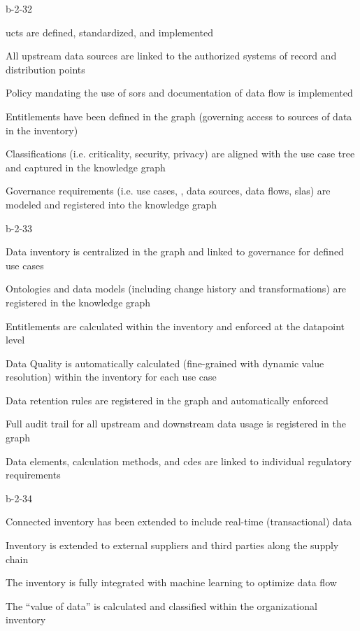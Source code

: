 \begin{level-assessment}{b-2-3}{2}

  \item \glspl{uct} are defined, standardized, and implemented
  \item All upstream data sources are linked to the authorized systems of record and distribution points
  \item Policy mandating the use of \glspl{sor} and documentation of data flow is implemented
  \item Entitlements have been defined in the graph (governing access to sources of data in the inventory)
  \item Classifications (i.e. criticality, security, privacy) are aligned with the use case tree and captured in the
        knowledge graph
  \item Governance requirements (i.e. use cases, , data sources, data flows, \glspl{sla})
        are modeled and registered into the knowledge graph

\end{level-assessment}

\begin{level-assessment}{b-2-3}{3}

  \item Data inventory is centralized in the graph and linked to governance for defined use cases
  \item Ontologies and data models (including change history and transformations) are registered in the knowledge graph
  \item Entitlements are calculated within the inventory and enforced at the datapoint level
  \item Data Quality is automatically calculated (fine-grained with dynamic value resolution) within
        the inventory for each use case
  \item Data retention rules are registered in the graph and automatically enforced
  \item Full audit trail for all upstream and downstream data usage is registered in the graph
  \item Data elements, calculation methods, and \glspl{cde} are linked to individual regulatory requirements

\end{level-assessment}

\begin{level-assessment}{b-2-3}{4}

  \item Connected inventory has been extended to include real-time (transactional) data
  \item Inventory is extended to external suppliers and third parties along the supply chain
  \item The inventory is fully integrated with machine learning to optimize data flow
  \item The “value of data” is calculated and classified within the organizational inventory

\end{level-assessment}


